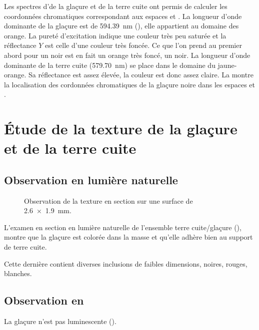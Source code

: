 Les spectres d'\AO de la glaçure et de la terre cuite ont permis de calculer les coordonnées chromatiques correspondant aux espaces \Yxy et \Lab. La longueur d'onde dominante de la glaçure est de \SI{594.39}{\nm} (), elle appartient au domaine des orange. La pureté d'excitation indique une couleur très peu saturée et la réflectance $Y$ est celle d'une couleur très foncée. Ce que l'on prend au premier abord pour un noir est en fait un orange très foncé, un noir. La longueur d'onde dominante de la terre cuite (\SI{579.70}{\nm}) se place dans le domaine du jaune-orange. Sa réflectance est assez élevée, la couleur est donc assez claire. La  montre la localisation des cordonnées chromatiques de la glaçure noire dans les espaces \Yxy et \Lab.


\section{Étude de la texture de la glaçure et de la terre cuite}

\subsection{Observation en lumière naturelle}
\begin{figure}[htb]
  \begin{minipage}[t]{0.4\textwidth}
  \end{minipage}
  \begin{minipage}[t]{0.4\textwidth}
    \subcaption{\CL \label{texture:6530_CL}}
  \end{minipage}
  \caption[\ -- Observation de la texture en section]
          {\legendeC 
           Observation de la texture en section sur une surface de 
           \SI{2.6x1.9}{\mm}.}
  \label{texture:6530}
\end{figure}

L'examen en section en lumière naturelle de l'ensemble terre 
cuite/glaçure (), montre que la glaçure est 
colorée dans la masse et qu'elle adhère bien au support de terre cuite.

Cette dernière contient diverses inclusions de faibles dimensions,
noires, rouges, blanches.

\subsection{Observation en \CL}
La glaçure n'est pas luminescente ().

